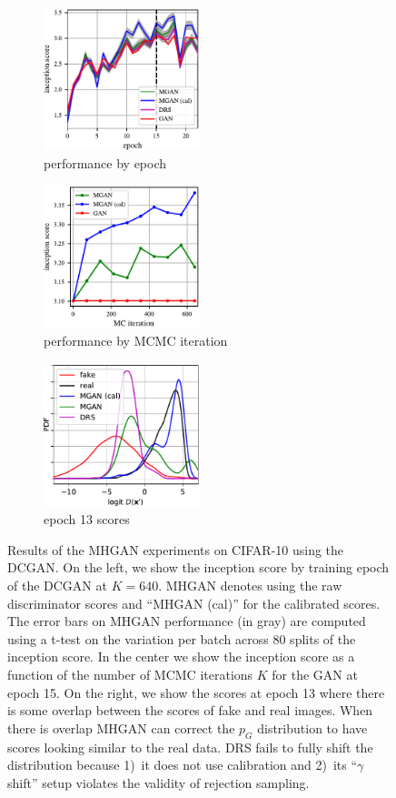 \documentclass{article}
\newcommand{\PG}{{p_G}}
\begin{document}
\begin{figure}
    \centering
    \begin{subfigure}[b]{0.32\textwidth}
       \centering
       \includegraphics[width=1.8in]{figures/per_epoch.pdf}
       \caption{performance by epoch}
       \label{fig:incep_by_epoch}
    \end{subfigure}
    \begin{subfigure}[b]{0.32\textwidth}
       \centering
       \includegraphics[width=1.8in]{figures/plot_per_mh.pdf}
       \caption{performance by MCMC iteration}
       \label{fig:incep_by_iter}
    \end{subfigure}
    \begin{subfigure}[b]{0.32\textwidth}
       \centering
       \includegraphics[width=1.8in]{figures/score_dist_overlap.pdf}
       \caption{epoch 13 scores}
       \label{fig:score_dist_overlap}
    \end{subfigure}
    \caption{{\small
    Results of the MHGAN experiments on CIFAR-10 using the DCGAN\@.
    On the left, we show the inception score by training epoch of the DCGAN at $K=640$.
    MHGAN denotes using the raw discriminator scores and ``MHGAN (cal)'' for the calibrated scores.
    The error bars on MHGAN performance (in gray) are computed using a t-test on the variation per batch across 80 splits of the inception score.
    In the center we show the inception score as a function of the number of MCMC iterations $K$ for the GAN at epoch 15.
    On the right, we show the scores at epoch 13 where there is some overlap between the scores of fake and real images.
    When there is overlap MHGAN can correct the $\PG$ distribution to have scores looking similar to the real data.
    DRS fails to fully shift the distribution because 1)~it does not use calibration and 2)~its ``$\gamma$ shift'' setup violates the validity of rejection sampling.
    }}
\end{figure}
\end{document}
